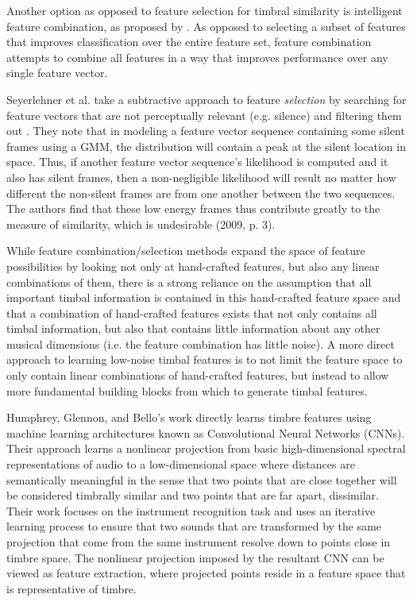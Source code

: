 \documentclass[a4paper,12pt]{report} 	%
\numberwithin{figure}{chapter}
\numberwithin{table}{chapter}
\numberwithin{equation}{chapter}
\begin{document}
\begin{flushleft}
Another option as opposed to feature selection for timbral similarity is intelligent feature combination, as proposed by \cite{Fu:2009mz}. As opposed to selecting a subset of features that improves classification over the entire feature set, feature combination attempts to combine all features in a way that  improves performance over any single feature vector.

Seyerlehner et al. take a subtractive approach to feature \emph{selection} by searching for feature vectors that are not perceptually relevant (e.g. silence) and filtering them out \cite{Seyerlehner:2009hs}. They note that in modeling a feature vector sequence containing some silent frames using a GMM, the distribution will contain a peak at the silent location in space. Thus, if another feature vector sequence's likelihood is computed and it also has silent frames, then a non-negligible likelihood will result no matter how different the non-silent frames are from one another between the two sequences. The authors find that these low energy frames thus contribute greatly to the measure of similarity, which is undesirable (2009, p. 3).

While feature combination/selection methods expand the space of feature possibilities by looking not only at hand-crafted features, but also any linear combinations of them, there is a strong reliance on the assumption that all important timbal information is contained in this hand-crafted feature space and that a combination of hand-crafted features exists that not only contains all timbal information, but also that contains little information about any other musical dimensions (i.e. the feature combination has little noise). A more direct approach to learning low-noise timbal features is to not limit the feature space to only contain linear combinations of hand-crafted features, but instead to allow more fundamental building blocks from which to generate timbal features.

Humphrey, Glennon, and Bello's \cite{Humphrey:2000th} work directly learns timbre features using machine learning architectures known as Convolutional Neural Networks (CNNs). Their approach learns a nonlinear projection from basic high-dimensional spectral representations of audio to a low-dimensional space where distances are semantically meaningful in the sense that two points that are close together will be considered timbrally similar and two points that are far apart, dissimilar. Their work focuses on the instrument recognition task and uses an iterative learning process to ensure that two sounds that are transformed by the same projection that come from the same instrument resolve down to points close in timbre space. The nonlinear projection imposed by the resultant CNN can be viewed as feature extraction, where projected points reside in a feature space that is representative of timbre.


\end{flushleft}
\end{document}
